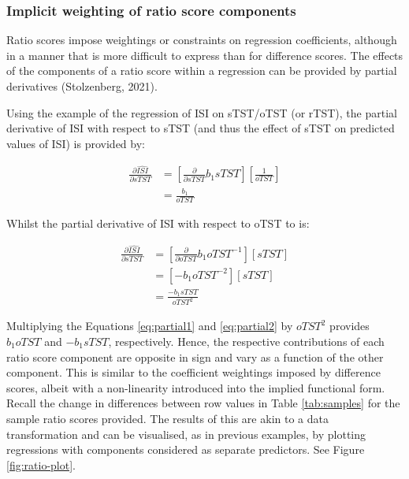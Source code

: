 \documentclass[
]{article}
\begin{document}
\subsubsection{Implicit weighting of ratio score components}\label{implicit-weighting-of-ratio-score-components}

Ratio scores impose weightings or constraints on regression coefficients, although in a manner that is more difficult to express than for difference scores. The effects of the components of a ratio score within a regression can be provided by partial derivatives (Stolzenberg, 2021).

Using the example of the regression of ISI on sTST/oTST (or rTST), the partial derivative of ISI with respect to sTST (and thus the effect of sTST on predicted values of ISI) is provided by:

\begin{equation}
\begin{split}
\frac{\partial{\hat{ISI}}}{\partial{sTST}} & = [\frac{\partial}{\partial{sTST}}b_{1}{sTST}][\frac{1}{oTST}] \\
& = \frac{b_{1}}{oTST}
\end{split}
\label{eq:partial1}
\end{equation}

Whilst the partial derivative of ISI with respect to oTST to is:

\begin{equation}
\begin{split}
\frac{\partial{\hat{ISI}}}{\partial{sTST}} & = [\frac{\partial}{\partial{oTST}} b_{1}{oTST}^{-1}][{sTST}] \\
& = [-b_{1}{oTST}^{-2}][{sTST}] \\
& = \frac{-b_{1}{sTST}}{{oTST}^{2}}
\end{split}
\label{eq:partial2}
\end{equation}

Multiplying the Equations \eqref{eq:partial1} and \eqref{eq:partial2} by \(oTST^{2}\) provides \(b_{1}oTST\) and \(-b_{1}sTST\), respectively. Hence, the respective contributions of each ratio score component are opposite in sign and vary as a function of the other component. This is similar to the coefficient weightings imposed by difference scores, albeit with a non-linearity introduced into the implied functional form. Recall the change in differences between row values in Table \ref{tab:samples} for the sample ratio scores provided. The results of this are akin to a data transformation and can be visualised, as in previous examples, by plotting regressions with components considered as separate predictors. See Figure \ref{fig:ratio-plot}.
\end{document}
